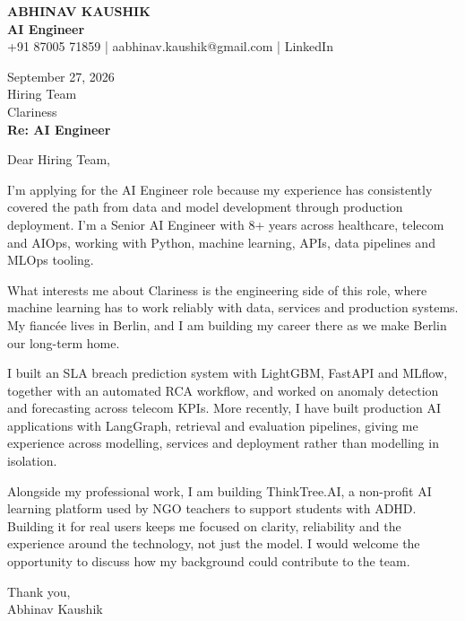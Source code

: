 \documentclass[10pt,a4paper]{article}
\begin{document}
\begin{center}
{\Large\bfseries ABHINAV KAUSHIK}\\[2pt]
{\bfseries AI Engineer}\\[2pt]
+91 87005 71859 \quad | \quad aabhinav.kaushik@gmail.com \quad | \quad LinkedIn
\end{center}
\vspace{8pt}
September 27, 2026\\[6pt]
Hiring Team\\
Clariness\\[4pt]
\textbf{Re: AI Engineer}

Dear Hiring Team,

I’m applying for the AI Engineer role because my experience has consistently covered the path from data and model development through production deployment. I’m a Senior AI Engineer with 8+ years across healthcare, telecom and AIOps, working with Python, machine learning, APIs, data pipelines and MLOps tooling.

What interests me about Clariness is the engineering side of this role, where machine learning has to work reliably with data, services and production systems. My fiancée lives in Berlin, and I am building my career there as we make Berlin our long-term home.

I built an SLA breach prediction system with LightGBM, FastAPI and MLflow, together with an automated RCA workflow, and worked on anomaly detection and forecasting across telecom KPIs. More recently, I have built production AI applications with LangGraph, retrieval and evaluation pipelines, giving me experience across modelling, services and deployment rather than modelling in isolation.

Alongside my professional work, I am building ThinkTree.AI, a non-profit AI learning platform used by NGO teachers to support students with ADHD. Building it for real users keeps me focused on clarity, reliability and the experience around the technology, not just the model. I would welcome the opportunity to discuss how my background could contribute to the team.

Thank you,\\
Abhinav Kaushik
\end{document}
